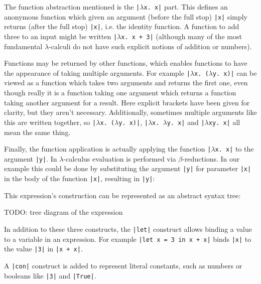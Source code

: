 \documentclass[a4paper,fleqn,twoside,12pt]{report}
\begin{document}
The function abstraction mentioned is the \texttt{|$\lambda$x. x|} part. This defines an anonymous function which given an argument (before the full stop) \texttt{|x|} simply returns (after the full stop) \texttt{|x|}, i.e. the identity function. A function to add three to an input might be written \texttt{|$\lambda$x. x + 3|} (although many of the most fundamental $\lambda$-calculi do not have such explicit notions of addition or numbers).

Functions may be returned by other functions, which enables functions to have the appearance of taking multiple arguments. For example \texttt{|$\lambda$x. ($\lambda$y. x)|} can be viewed as a function which takes two arguments and returns the first one, even though really it is a function taking one argument which returns a function taking another argument for a result. Here explicit brackets have been given for clarity, but they aren’t necessary. Additionally, sometimes multiple arguments like this are written together, so \texttt{|$\lambda$x. ($\lambda$y. x)|}, \texttt{|$\lambda$x. $\lambda$y. x|} and \texttt{|$\lambda$xy. x|} all mean the same thing.

Finally, the function application is actually applying the function \texttt{|$\lambda$x. x|} to the argument \texttt{|y|}. In $\lambda$-calculus evaluation is performed via $\beta$-reductions. In our example this could be done by substituting the argument \texttt{|y|} for parameter \texttt{|x|} in the body of the function \texttt{|x|}, resulting in \texttt{|y|}:

This expression’s construction can be represented as an abstract syntax tree:

TODO: tree diagram of the expression

In addition to these three constructs, the \texttt{|let|} construct allows binding a value to a variable in an expression. For example \texttt{|let x = 3 in x + x|} binds \texttt{|x|} to the value \texttt{|3|} in \texttt{|x + x|}.

A \texttt{|con|} construct is added to represent literal constants, such as numbers or booleans like \texttt{|3|} and \texttt{|True|}.
\end{document}
